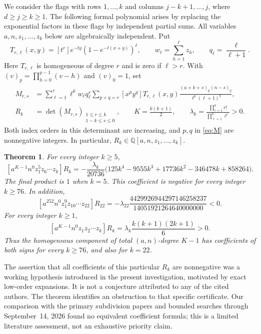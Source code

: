 \documentclass[11pt]{article}
\newtheorem{theorem}{Theorem}
\newcommand{\Q}{\mathbb{Q}}
\newcommand{\fall}[2]{(#1)_{\underline{#2}}}
\newcommand{\coef}[1]{\left[#1\right]}
\begin{document}
We consider the flags with rows $1,\ldots,k$ and columns
$j-k+1,\ldots,j$, where $d\geq j\geq k\geq1$. The following formal
polynomial arises by replacing the exponential factors in these flags by
independent partial sums. All variables $a,n,z_1,\ldots,z_k$ below are
algebraically independent. Put
\begin{equation}\label{eq:T}
 T_{r,\ell}(x,y)=\coef{t^r}e^{-ty}
       (1-e^{-t(x+y)})^\ell,\qquad
 w_\ell=\sum_{h=1}^{\ell}z_h,\qquad q_\ell=\frac{\ell}{\ell+1}.
\end{equation}
Here $T_{r,\ell}$ is homogeneous of degree $r$ and is zero if $\ell>r$.
With $\fall{v}{p}=\prod_{h=0}^{p-1}(v-h)$ and $\fall{v}{0}=1$, set
\begin{align}
 M_{r,s}&=\sum_{\ell=1}^r\ell^k w_\ell q_\ell^s
 \sum_{p+q=r}\coef{x^py^q}T_{r,\ell}(x,y)
 \frac{\fall{a+k+s}{p}\fall{n-s}{q}}{\ell^p(\ell+1)^q},
 \label{eq:M}\\
 R_k&=\det(M_{r,s})_{\substack{1\leq r\leq k\\1-k\leq s\leq0}},
 \qquad K=\frac{k(k+1)}2,\qquad
 \lambda_k=\frac{\prod_{r=1}^k r!}{\prod_{\ell=1}^k\ell^\ell}>0.
 \label{eq:R}
\end{align}
Both index orders in this determinant are increasing, and $p,q$ in
\eqref{eq:M} are nonnegative integers. In particular,
$R_k\in\Q[a,n,z_1,\ldots,z_k]$.

\begin{theorem}\label{thm:main}
For every integer $k\geq5$,
\begin{equation}\label{eq:quartic}
 \coef{a^{K-1}n^0z_1^5z_6\cdots z_k}R_k
 =-\frac{\lambda_k}{20736}
  \bigl(125k^4-9555k^3+17736k^2-346478k+858264\bigr).
\end{equation}
The final product is $1$ when $k=5$. This coefficient is negative for
every integer $k\geq76$. In addition,
\begin{equation}\label{eq:22}
 \coef{a^{252}n^0z_1^9z_{10}\cdots z_{22}}R_{22}
 =-\lambda_{22}\frac{4429926944297146258237}{14051921264640000000}<0.
\end{equation}
For every integer $k\geq1$,
\begin{equation}\label{eq:positive}
 \coef{a^{K-1}n^0z_1z_2\cdots z_k}R_k
 =\lambda_k\frac{k(k+1)(2k+1)}6>0.
\end{equation}
Thus the homogeneous component of total $(a,n)$-degree $K-1$ has
coefficients of both signs for every $k\geq76$, and also for $k=22$.
\end{theorem}

The assertion that all coefficients of this particular $R_k$ are
nonnegative was a working hypothesis introduced in the present
investigation, motivated by exact low-order expansions. It is not a
conjecture attributed to any of the cited authors. The theorem identifies
an obstruction to that specific certificate. Our comparison with the
primary subdivision papers and bounded searches through September~14,
2026 found no equivalent coefficient formula; this is a limited literature
assessment, not an exhaustive priority claim.
\end{document}
